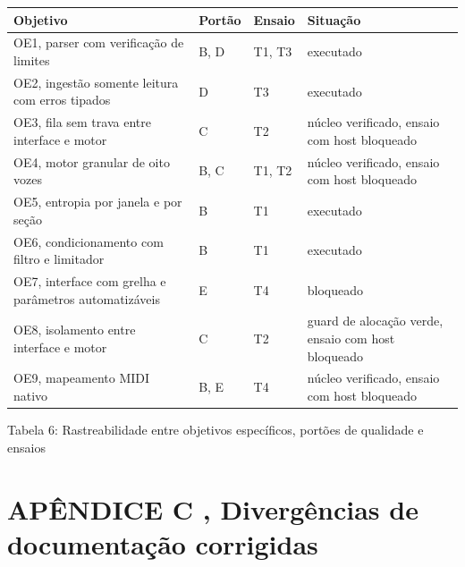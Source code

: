 \documentclass[12pt,a4paper]{article}
\begin{document}
\begin{center}
\footnotesize
\setlength{\tabcolsep}{4pt}
\begin{tabular}{p{}|p{}|p{}|p{}}
\hline
\textbf{Objetivo} & \textbf{Portão} & \textbf{Ensaio} & \textbf{Situação} \\
\hline
OE1, parser com verificação de limites & B, D & T1, T3 & executado \\
OE2, ingestão somente leitura com erros tipados & D & T3 & executado \\
OE3, fila sem trava entre interface e motor & C & T2 & núcleo verificado, ensaio com host bloqueado \\
OE4, motor granular de oito vozes & B, C & T1, T2 & núcleo verificado, ensaio com host bloqueado \\
OE5, entropia por janela e por seção & B & T1 & executado \\
OE6, condicionamento com filtro e limitador & B & T1 & executado \\
OE7, interface com grelha e parâmetros automatizáveis & E & T4 & bloqueado \\
OE8, isolamento entre interface e motor & C & T2 & guard de alocação verde, ensaio com host bloqueado \\
OE9, mapeamento MIDI nativo & B, E & T4 & núcleo verificado, ensaio com host bloqueado \\
\hline
\end{tabular}
\end{center}
\noindent Tabela 6: Rastreabilidade entre objetivos específicos, portões de qualidade e ensaios\par
\label{tab:6}
\vspace{2pt}{\footnotesize\noindent Elaborado pelos autores (2026).\par}

\section*{APÊNDICE C ,  Divergências de documentação corrigidas}
\end{document}
